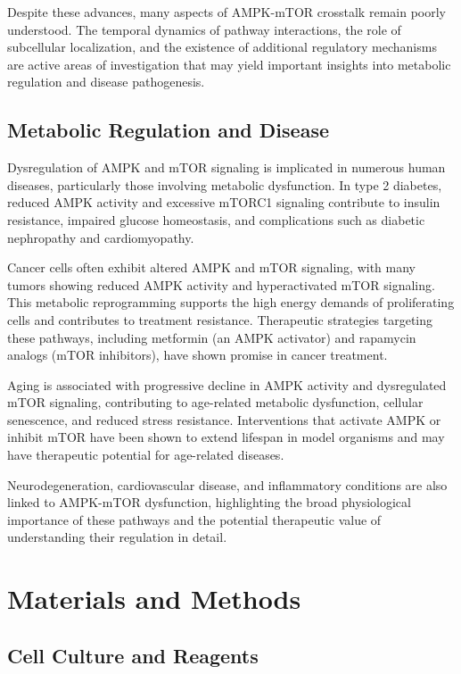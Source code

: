 \documentclass[11pt,a4paper]{article}
\begin{document}
Despite these advances, many aspects of AMPK-mTOR crosstalk remain poorly understood. The temporal dynamics of pathway interactions, the role of subcellular localization, and the existence of additional regulatory mechanisms are active areas of investigation that may yield important insights into metabolic regulation and disease pathogenesis.

\subsection{Metabolic Regulation and Disease}

Dysregulation of AMPK and mTOR signaling is implicated in numerous human diseases, particularly those involving metabolic dysfunction. In type 2 diabetes, reduced AMPK activity and excessive mTORC1 signaling contribute to insulin resistance, impaired glucose homeostasis, and complications such as diabetic nephropathy and cardiomyopathy.

Cancer cells often exhibit altered AMPK and mTOR signaling, with many tumors showing reduced AMPK activity and hyperactivated mTOR signaling. This metabolic reprogramming supports the high energy demands of proliferating cells and contributes to treatment resistance. Therapeutic strategies targeting these pathways, including metformin (an AMPK activator) and rapamycin analogs (mTOR inhibitors), have shown promise in cancer treatment.

Aging is associated with progressive decline in AMPK activity and dysregulated mTOR signaling, contributing to age-related metabolic dysfunction, cellular senescence, and reduced stress resistance. Interventions that activate AMPK or inhibit mTOR have been shown to extend lifespan in model organisms and may have therapeutic potential for age-related diseases.

Neurodegeneration, cardiovascular disease, and inflammatory conditions are also linked to AMPK-mTOR dysfunction, highlighting the broad physiological importance of these pathways and the potential therapeutic value of understanding their regulation in detail.

\section{Materials and Methods}

\subsection{Cell Culture and Reagents}
\end{document}
